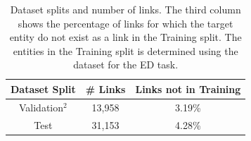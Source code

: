 \documentclass{report}
\theoremstyle{definition}
\theoremstyle{remark}
\begin{document}
\begin{table}[H]
    \centering
    \begin{tabular}{ccc}
    Dataset Split & \# Links & Links not in Training\\
    \hline
    Validation$^2$ &  13,958 & 3.19\% \\
    Test &            31,153 & 4.28\% \\
    \end{tabular}
    \caption{Dataset splits and number of links. The third column shows the percentage of links for which the target entity do not exist as a link in the Training split. The entities in the Training split is determined using the dataset for the ED task.}
    \label{tab:goldstatsel3}
\end{table}
\end{document}
